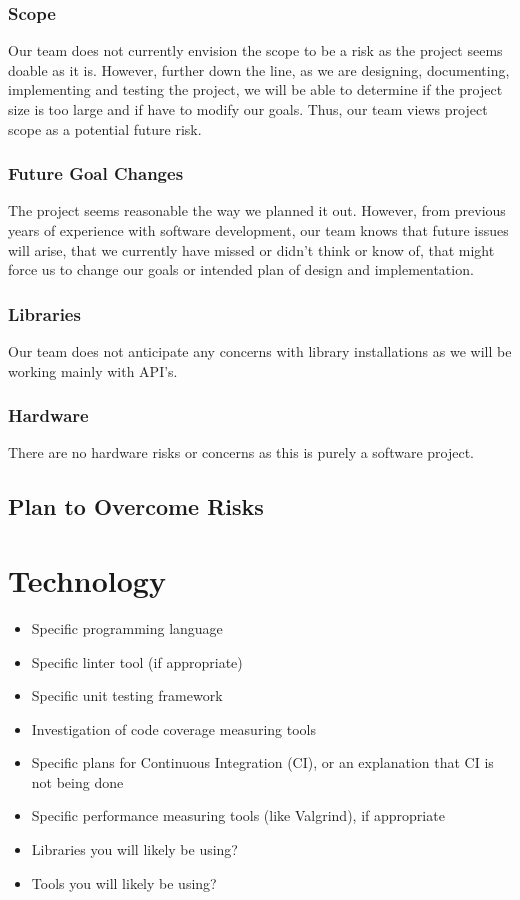 \documentclass{article}
\begin{document}
\subsubsection{Scope}
Our team does not currently envision the scope to be a risk as the project seems doable as it is. However, further down the line, as we are designing, documenting, implementing and testing the project, we will be able to determine if the project size is too large and if have to modify our goals. Thus, our team views project scope as a potential future risk.

\subsubsection{Future Goal Changes}
The project seems reasonable the way we planned it out. However, from previous years of experience with software development, our team knows that future issues will arise, that we currently have missed or didn't think or know of, that might force us to change our goals or intended plan of design and implementation.

\subsubsection{Libraries}
Our team does not anticipate any concerns with library installations as we will be working mainly with API's.

\subsubsection{Hardware}
There are no hardware risks or concerns as this is purely a software project.

\subsection{Plan to Overcome Risks}


\section{Technology}

\begin{itemize}
	\item Specific programming language
	\item Specific linter tool (if appropriate)
	\item Specific unit testing framework
	\item Investigation of code coverage measuring tools
	\item Specific plans for Continuous Integration (CI), or an explanation that CI
	is not being done
	\item Specific performance measuring tools (like Valgrind), if
	appropriate
	\item Libraries you will likely be using?
	\item Tools you will likely be using?
\end{itemize}
\end{document}
